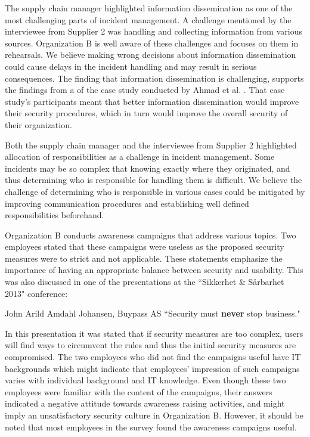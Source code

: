 The supply chain manager highlighted information dissemination as one of the most challenging parts of incident management. A challenge mentioned by the interviewee from Supplier 2 was handling and collecting information from various sources. Organization B is well aware of these challenges and focuses on them in rehearsals. We believe making wrong decisions about information dissemination could cause delays in the incident handling and may result in serious consequences. The finding that information dissemination is challenging, supports the findings from a of the case study conducted by Ahmad et al. \cite{ahmad2012incident}. That case study's participants meant that better information dissemination would improve their security procedures, which in turn would improve the overall security of their organization. 

Both the supply chain manager and the interviewee from Supplier 2 highlighted allocation of responsibilities as a challenge in incident management. Some incidents may be so complex that knowing exactly where they originated, and thus determining who is responsible for handling them is difficult. We believe the challenge of determining who is responsible in various cases could be mitigated by improving communication procedures and establishing well defined responsibilities beforehand.  

Organization B conducts awareness campaigns that address various topics. Two employees stated that these campaigns were useless as the proposed security measures were to strict and not applicable. These statements emphasize the importance of having an appropriate balance between security and usability. This was also discussed in one of the presentations at the ``Sikkerhet \& S\aa rbarhet 2013" conference:

\begin{newquote}{John Arild Amdahl Johansen, Buypass AS}
``Security must \textbf{never} stop business."
\end{newquote}

In this presentation it was stated that if security measures are too complex, users will find ways to circumvent the rules and thus the initial security measures are compromised. The two employees who did not find the campaigns useful have IT backgrounds which might indicate that employees' impression of such campaigns varies with individual background and IT knowledge. Even though these two employees were familiar with the content of the campaigns, their answers indicated a negative attitude towards awareness raising activities, and might imply an unsatisfactory security culture in Organization B. However, it should be noted that most employees in the survey found the awareness campaigns useful.


